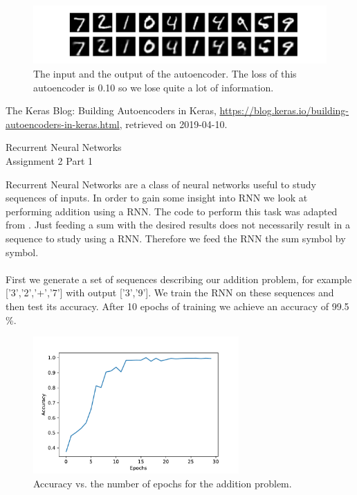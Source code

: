 \documentclass[10 pt, a4paper]{article}
\begin{document}
\begin{figure}[H]
  \centering
    \includegraphics[width=\textwidth]{AutoEn}
  \caption{The input and the output of the autoencoder. The loss of this autoencoder is 0.10 so we lose quite a lot of information.}
  \label{fig:auto}
\end{figure}

\vfill

\begin{thebibliography}{99}

The Keras Blog: Building Autoencoders in Keras, \url{https://blog.keras.io/building-autoencoders-in-keras.html}, retrieved on 2019-04-10.

\end{thebibliography}

\newpage

\begin{center}
\huge Recurrent Neural Networks \\
\Large Assignment 2 Part 1
\end{center}

\setcounter{figure}{0}

Recurrent Neural Networks are a class of neural networks useful to study sequences of inputs. In order to gain some insight into RNN we look at performing addition using a RNN. The code to perform this task was adapted from \cite{RNN}. Just feeding a sum with the desired results does not necessarily result in a sequence to study using a RNN. Therefore we feed the RNN the sum symbol by symbol.
\\
\\
First we generate a set of sequences describing our addition problem, for example ['3','2','+','7'] with output ['3','9']. We train the RNN on these sequences and then test its accuracy. After 10 epochs of training we achieve an accuracy of 99.5 \%.

\begin{figure}[H]
  \centering
    \includegraphics[width=0.7\textwidth]{AccuracyRNN}
  \caption{Accuracy vs. the number of epochs for the addition problem.}
  \label{fig:AccuracyRNN}
\end{figure}
\end{document}
